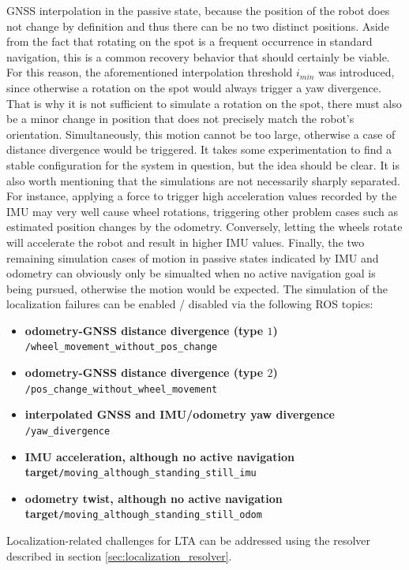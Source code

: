\documentclass[english, master, utf8]{base/thesis_KBS}
\newcommand{\code}[1]{\colorbox{light-gray}{\texttt{#1}}}
\begin{document}
GNSS interpolation in the passive state, because the position of the robot does not change by definition and thus there can be no two distinct positions. Aside from the fact that
rotating on the spot is a frequent occurrence in standard navigation, this is a common recovery behavior that should certainly be viable. For this reason, the aforementioned
interpolation threshold $i_{min}$ was introduced, since otherwise a rotation on the spot would always trigger a yaw divergence. That is why it is not sufficient to simulate a
rotation on the spot, there must also be a minor change in position that does not precisely match the robot's orientation. Simultaneously, this motion cannot be too large, otherwise
a case of distance divergence would be triggered. It takes some experimentation to find a stable configuration for the system in question, but the idea should be clear.
It is also worth mentioning that the simulations are not necessarily sharply separated. For instance, applying a force to trigger high acceleration values recorded by the IMU may
very well cause wheel rotations, triggering other problem cases such as estimated position changes by the odometry. Conversely, letting the wheels rotate will accelerate the robot
and result in higher IMU values. Finally, the two remaining simulation cases of motion in passive states indicated by IMU and odometry can obviously only be simualted when no
active navigation goal is being pursued, otherwise the motion would be expected. The simulation of the localization failures can be enabled / disabled via the following ROS topics:
\begin{itemize}
    \item \textbf{odometry-GNSS distance divergence (type $1$)} \textrightarrow \code{/wheel\_movement\_without\_pos\_change}
    \item \textbf{odometry-GNSS distance divergence (type $2$)} \textrightarrow \code{/pos\_change\_without\_wheel\_movement}
    \item \textbf{interpolated GNSS and IMU/odometry yaw divergence} \textrightarrow \code{/yaw\_divergence}
    \item \textbf{IMU acceleration, although no active navigation target}\newline \textrightarrow \code{/moving\_although\_standing\_still\_imu}
    \item \textbf{odometry twist, although no active navigation target}\newline \textrightarrow \code{/moving\_although\_standing\_still\_odom}
\end{itemize}
\noindent
Localization-related challenges for LTA can be addressed using the resolver described in section \ref{sec:localization_resolver}.
\end{document}
